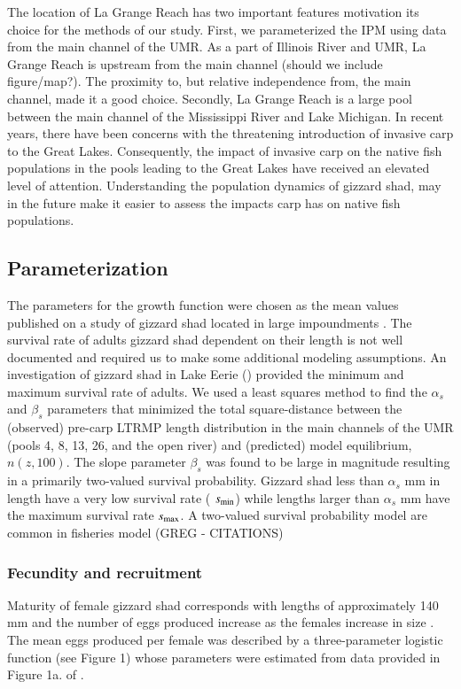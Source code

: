 \documentclass[preprint,review,12pt,authoryear]{elsarticle}
\def\ds{\displaystyle}
\begin{document}
The location of La Grange Reach has two important features motivation its choice for the methods of our study. 
First, we parameterized the IPM using data from the main channel of the UMR.  As a part of Illinois River and UMR, La Grange Reach is upstream from the main channel (should we include figure/map?).  
The proximity to, but relative independence from, the main channel, made it a good choice.  Secondly, La Grange Reach is a large pool between the main channel of the Mississippi River and Lake Michigan.  
In recent years, there have been concerns with the threatening introduction of invasive carp to the Great Lakes.  
Consequently, the impact of invasive carp on the native fish populations in the pools leading to the Great Lakes have received an elevated level of attention.  
Understanding the population dynamics of gizzard shad, may in the future make it easier to assess the impacts carp has on native fish populations.

\subsection{Parameterization}
The parameters for the growth function were chosen as the mean values published on a study of gizzard shad located in large impoundments \citep{michaletz2017variation}. 
The survival rate of adults gizzard shad dependent on their length is not well documented and required us to make some additional modeling assumptions.  
An investigation of gizzard shad in Lake Eerie (\cite{bodola1955life}) provided the minimum and maximum survival rate of adults. 
We used a least squares method to find the $\alpha_s$ and $\beta_s$ parameters that 
minimized the total square-distance between the (observed) pre-carp LTRMP length distribution in the main channels of the UMR (pools 4, 8, 13, 26, and the open river) and (predicted) model equilibrium, $n(z,100)$.  
The slope parameter $\beta_s$ was found to be large in magnitude resulting in a primarily two-valued survival probability.  
Gizzard shad less than $\alpha_s$ mm in length have a very low survival rate ( $\ds s_{\rm {min}}$) while lengths larger than  $\alpha_s$ mm have the maximum survival rate $\ds s_{\rm {max}}$. 
A two-valued survival probability model are common in fisheries model (GREG - CITATIONS)

\subsubsection{Fecundity and recruitment}
Maturity of female gizzard shad corresponds with lengths of approximately 140 mm and the number of eggs produced increase as the females increase in size \citep{jons1997ovarian}.  
The mean eggs produced per female was described by a three-parameter logistic function (see Figure 1) whose parameters were estimated from data provided in Figure 1a. of \citep{jons1997ovarian}. 
\end{document}
